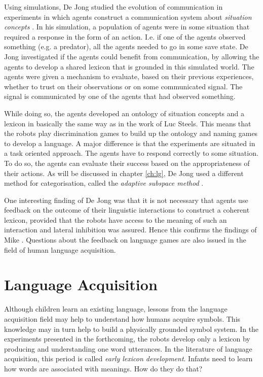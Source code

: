 Using simulations, De Jong studied  the evolution of communication in experiments in which agents construct a communication system about {\em situation concepts} \citep{dejong:99b}. In his simulation, a population of agents were in some situation that required a response in the form of an action. I.e.  if one of the agents observed something (e.g. a predator), all the agents needed to go in some save state. De Jong investigated if the agents could benefit from communication, by allowing the agents to develop a shared lexicon that is grounded in this simulated world. The agents were given a mechanism to evaluate, based on their previous experiences, whether to trust on their observations or on some communicated signal. The signal is communicated by one of the agents that had observed something.

While doing so, the agents developed an ontology of situation concepts and a lexicon in basically the same way as in the work of Luc Steels. This means that the robots play discrimination games to build up the ontology and naming games to develop a language. A major difference is that the experiments are situated in a task oriented approach. The agents have to respond correctly to some situation. To do so, the agents can evaluate their success based on the appropriateness of their actions. As will be discussed in chapter \ref{ch:lg}, De Jong used a different method for categorisation, called the {\em adaptive subspace method} \citep{dejongvogt:1998}.

One interesting finding of De Jong was that it is not necessary that agents use feedback on the outcome of their linguistic interactions to construct a coherent lexicon, provided that the robots have access to the meaning of such an interaction and lateral inhibition was assured. Hence this confirms the findings of Mike \citet{oliphant:1998}. Questions about the feedback on language games are also issued in the field of human language acquisition.


\section{Language Acquisition}\label{s:intro:acquisition}

Although children learn an existing language, lessons from the language acquisition field may help to understand how humans acquire symbols. This knowledge may in turn help to build a physically grounded symbol system. In the experiments presented in the forthcoming, the robots develop only a lexicon by producing and understanding one word utterances. In the literature of language acquisition, this period is called {\em early lexicon development}. Infants need to learn how words are associated with meanings. How do they do that?

